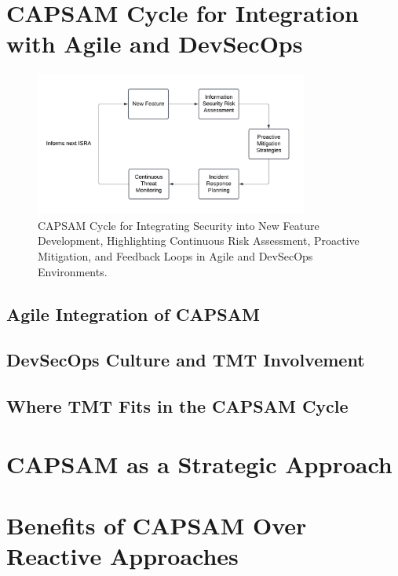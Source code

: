 \section{CAPSAM Cycle for Integration with Agile and DevSecOps}
\begin{figure}[htbp]
    \centering
    \includegraphics[width=0.8\textwidth]{figures/CAPSAM-Cycle.png}
    \caption{CAPSAM Cycle for Integrating Security into New Feature Development, Highlighting Continuous Risk Assessment, Proactive Mitigation, and Feedback Loops in Agile and DevSecOps Environments.}
    \label{fig:CAPSAM}
\end{figure}

\subsection{Agile Integration of CAPSAM}

\subsection{DevSecOps Culture and TMT Involvement}

\subsection{Where TMT Fits in the CAPSAM Cycle}

\section{CAPSAM as a Strategic Approach}

\section{Benefits of CAPSAM Over Reactive Approaches}
